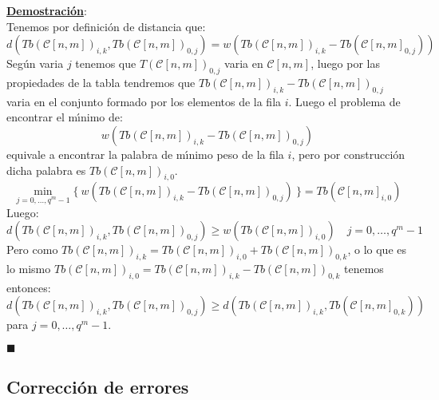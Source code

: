 \underline{\textbf{Demostraci\'on}}:\\
Tenemos por definici\'on de distancia que:
\begin{displaymath}
d(Tb(\mathcal{C}[n,m])_{i,k},Tb(\mathcal{C}[n,m])_{0,j}) =
w(Tb(\mathcal{C}[n,m])_{i,k}-Tb(\mathcal{C}[n,m]_{0,j}))
\end{displaymath}
Seg\'un varia $j$ tenemos que $T(\mathcal{C}[n,m])_{0,j}$ varia en
$\mathcal{C}[n,m]$, luego por las propiedades de la tabla tendremos que
$Tb(\mathcal{C}[n,m])_{i,k}-Tb(\mathcal{C}[n,m])_{0,j}$ varia en el
conjunto formado por los elementos de la fila $i$. Luego el problema de
encontrar el m\'{\i}nimo de:
\begin{displaymath}
w(Tb(\mathcal{C}[n,m])_{i,k}-Tb(\mathcal{C}[n,m])_{0,j})
\end{displaymath}
equivale a encontrar la palabra de m\'{\i}nimo peso de la fila $i$, pero por
cons\-trucci\'on dicha palabra es $Tb(\mathcal{C}[n,m])_{i,0}$.
\begin{displaymath}
\min_{j=0,\dots,q^{m}-1}\{\ w(Tb(\mathcal{C}[n,m])_{i,k}-
Tb(\mathcal{C}[n,m])_{0,j})\ \} = Tb(\mathcal{C}[n,m]_{i,0})
\end{displaymath}
Luego:
\begin{displaymath}
d(Tb(\mathcal{C}[n,m])_{i,k},Tb(\mathcal{C}[n,m])_{0,j})\geq
w(Tb(\mathcal{C}[n,m])_{i,0})\quad j=0,\dots,q^{m}-1
\end{displaymath}
Pero como $Tb(\mathcal{C}[n,m])_{i,k}=Tb(\mathcal{C}[n,m])_{i,0}+
Tb(\mathcal{C}[n,m])_{0,k}$, o lo que es lo mismo $Tb(\mathcal{C}[n,m])_{i,0}=
Tb(\mathcal{C}[n,m])_{i,k}-Tb(\mathcal{C}[n,m])_{0,k}$ tenemos entonces:
\begin{displaymath}
d(Tb(\mathcal{C}[n,m])_{i,k},Tb(\mathcal{C}[n,m])_{0,j})\geq
d(Tb(\mathcal{C}[n,m])_{i,k},Tb(\mathcal{C}[n,m]_{0,k}))
\end{displaymath}
para $j=0,\dots,q^{m}-1$.
\begin{flushright}
$\blacksquare$
\end{flushright}

\subsection{Correcci\'on de errores}

